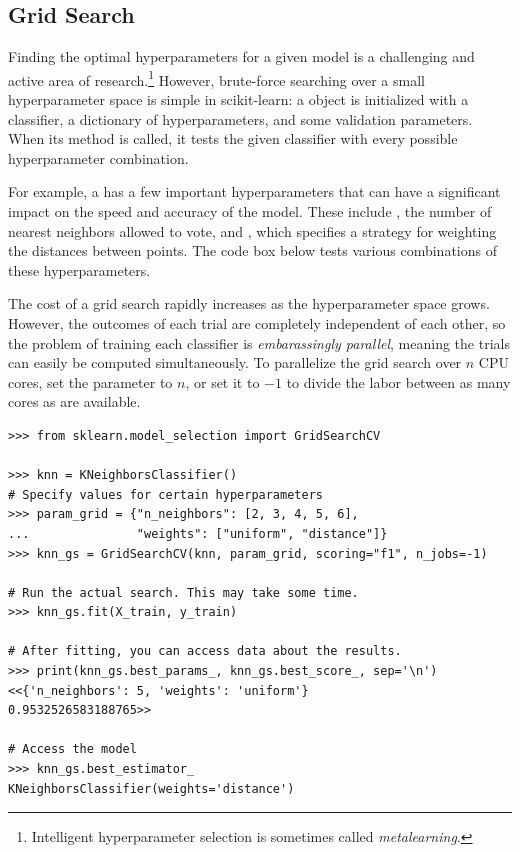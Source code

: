 \subsection*{Grid Search} %

Finding the optimal hyperparameters for a given model is a challenging and active area of research.\footnote{Intelligent hyperparameter selection is sometimes called \emph{metalearning}.}
However, brute-force searching over a small hyperparameter space is simple in scikit-learn: a  object is initialized with a classifier, a dictionary of hyperparameters, and some validation parameters.
When its  method is called, it tests the given classifier with every possible hyperparameter combination.

For example, a  has a few important hyperparameters that can have a significant impact on the speed and accuracy of the model.
These include , the number of nearest neighbors allowed to vote, and , which specifies a strategy for weighting the distances between points.
The code box below tests various combinations of these hyperparameters.

The cost of a grid search rapidly increases as the hyperparameter space grows.
However, the outcomes of each trial are completely independent of each other, so the problem of training each classifier is \emph{embarassingly parallel}, meaning the trials can easily be computed simultaneously.
To parallelize the grid search over $n$ CPU cores, set the  parameter to $n$, or set it to $-1$ to divide the labor between as many cores as are available.

\begin{lstlisting}
>>> from sklearn.model_selection import GridSearchCV

>>> knn = KNeighborsClassifier()
# Specify values for certain hyperparameters
>>> param_grid = {"n_neighbors": [2, 3, 4, 5, 6],
...               "weights": ["uniform", "distance"]}
>>> knn_gs = GridSearchCV(knn, param_grid, scoring="f1", n_jobs=-1)

# Run the actual search. This may take some time.
>>> knn_gs.fit(X_train, y_train)

# After fitting, you can access data about the results.
>>> print(knn_gs.best_params_, knn_gs.best_score_, sep='\n')
<<{'n_neighbors': 5, 'weights': 'uniform'}
0.9532526583188765>>

# Access the model
>>> knn_gs.best_estimator_
KNeighborsClassifier(weights='distance')
\end{lstlisting}

